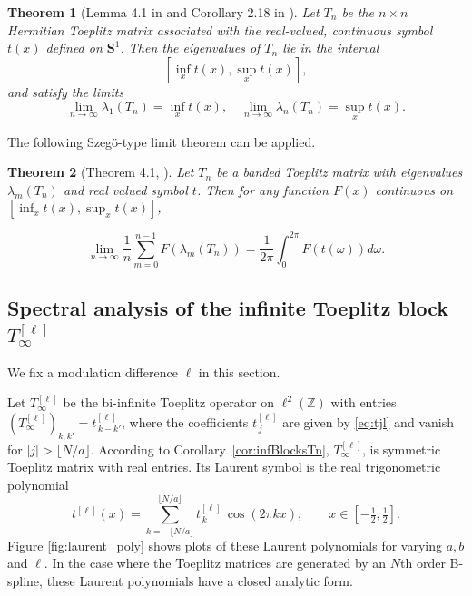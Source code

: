 \documentclass{article}
\newtheorem{theorem}{Theorem}[section]
\begin{document}
\begin{theorem}[Lemma 4.1 in \cite{gray2006toeplitz} and Corollary 2.18 in \cite{bottcher2000toeplitz}]\label{cor-bdsfiniteteop}
Let \( T_n \) be the \( n \times n \) Hermitian Toeplitz matrix associated with the real-valued, continuous symbol \( t(x) \) defined on \( \mathbf{S}^1 \). Then the eigenvalues of \( T_n \) lie in the interval
\[
[\inf_{x} t(x), \sup_{x} t(x)],
\]
and satisfy the limits
\[
\lim_{n \to \infty} \lambda_1(T_n) = \inf_{x} t(x), \quad
\lim_{n \to \infty} \lambda_n(T_n) = \sup_{x} t(x).
\]
\end{theorem}

The following Szeg\"{o}-type limit theorem can be applied.
\begin{theorem}[Theorem 4.1, \cite{gray2006toeplitz}]\label{thm:Tn_lim_eigs}
Let \( T_n \) be a banded Toeplitz matrix with eigenvalues $\lambda_m(T_n)$ and real valued symbol $t$. Then for any function $F(x)$ continuous on $[\inf_xt(x), \sup_xt(x)]$, 

\[\lim_{n\to\infty} \frac{1}{n}\sum_{m=0}^{n-1}F(\lambda_m(T_n))=\frac{1}{2\pi}\int_{0}^{2\pi}F(t(\omega))d\omega. \]


\end{theorem}


\subsection{Spectral analysis of the infinite Toeplitz block $T_{\infty}^{[\ell]}$}

We fix a modulation difference $\ell$ in this section.



Let $T_{\infty}^{[\ell]}$ be the bi-infinite Toeplitz operator on
$\ell^2(\mathbb{Z})$ with entries $(T_{\infty}^{[\ell]})_{k,k'}=t^{[\ell]}_{\,k-k'}$,
where the coefficients $t^{[\ell]}_{\,j}$ are given by \eqref{eq:tjl}
and vanish for $|j|>\lfloor N/a\rfloor$. According to Corollary~\ref{cor:infBlocksTn}, $T_{\infty}^{[\ell]}$, is symmetric Toeplitz matrix with real entries. Its Laurent symbol is the real
trigonometric polynomial
\[
t^{[\ell]}(x)=\sum_{k=-\lfloor N/a\rfloor}^{\lfloor N/a\rfloor} t^{[\ell]}_{\,k}\,\cos(2\pi k x),
\qquad x\in[-\tfrac{1}{2},\tfrac{1}{2}].
\]
Figure \ref{fig:laurent_poly} shows plots of these Laurent polynomials for varying $a,b$ and $\ell$. In the case where the Toeplitz matrices are generated by an $N$th order B-spline, these Laurent polynomials have a closed analytic form.
\end{document}
